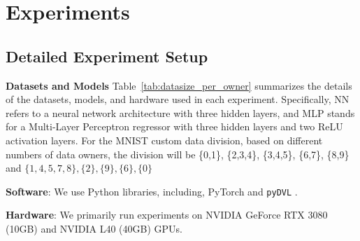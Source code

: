 \clearpage


\section{Experiments}
\label{appendix:exp}

\subsection{Detailed Experiment Setup}

\textbf{Datasets and Models} Table~\ref{tab:datasize_per_owner} summarizes the details of the datasets, models, and hardware used in each experiment. Specifically, NN refers to a neural network architecture with three hidden layers, and MLP stands for a Multi-Layer Perceptron regressor with three hidden layers and two ReLU activation layers. For the MNIST custom data division, based on different numbers of data owners, the division will be \{0,1\}, \{2,3,4\}, \{3,4,5\}, \{6,7\}, \{8,9\} and $\{1, 4, 5, 7, 8\}, \{2\}, \{9\}, \{6\}, \{0\}$ 

\textbf{Software}: We use Python libraries, including, PyTorch and \texttt{pyDVL} \cite{TransferLab_team_pyDVL_2024}.

\textbf{Hardware}: We primarily run experiments on NVIDIA GeForce RTX 3080 (10GB) and NVIDIA L40 (40GB) GPUs.

